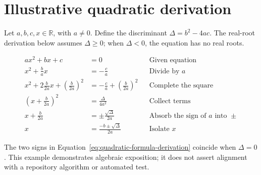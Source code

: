 \documentclass{article}
\begin{document}
\section*{Illustrative quadratic derivation}

Let $a,b,c,x\in\mathbb{R}$, with $a\ne0$. Define the discriminant
$\Delta=b^2-4ac$. The real-root derivation below assumes $\Delta\ge0$;
when $\Delta<0$, the equation has no real roots.

\begin{equation}
  \begin{aligned}
    ax^2+bx+c &= 0
      && \text{Given equation} \\
    x^2+\frac{b}{a}x &= -\frac{c}{a}
      && \text{Divide by }a \\
    x^2+2\frac{b}{2a}x+\left(\frac{b}{2a}\right)^2
      &= -\frac{c}{a}+\left(\frac{b}{2a}\right)^2
      && \text{Complete the square} \\
    \left(x+\frac{b}{2a}\right)^2
      &= \frac{\Delta}{4a^2}
      && \text{Collect terms} \\
    x+\frac{b}{2a} &= \pm\frac{\sqrt{\Delta}}{2a}
      && \text{Absorb the sign of }a\text{ into }\pm \\
    x &= \frac{-b\pm\sqrt{\Delta}}{2a}
      && \text{Isolate }x
  \end{aligned}
  \label{eq:quadratic-formula-derivation}
\end{equation}

The two signs in Equation~\ref{eq:quadratic-formula-derivation} coincide
when $\Delta=0$. This example demonstrates algebraic exposition; it does
not assert alignment with a repository algorithm or automated test.
\end{document}
